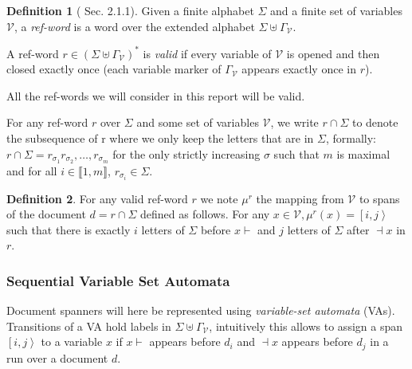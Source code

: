 \documentclass[12px]{article}
\theoremstyle{definition}
\newtheorem{definition}{Definition}
\newcommand{\Span}[1]{\left[ #1 \right\rangle}
\begin{document}
        \begin{definition}[\cite{peterfreund} Sec. 2.1.1]
          Given a finite alphabet $\Sigma$ and a finite set of variables
          $\mathcal{V}$, a \textit{ref-word} is a word over the extended
          alphabet $\Sigma \uplus \Gamma_\mathcal{V}$.

          A ref-word $r \in {(\Sigma \uplus \Gamma_\mathcal{V})}^*$ is
          \textit{valid} if every variable of $\mathcal{V}$ is opened and then
          closed exactly once (each variable marker of $\Gamma_\mathcal{V}$
          appears exactly once in $r$).
        \end{definition}

        All the ref-words we will consider in this report will be valid.

        For any ref-word $r$ over $\Sigma$ and some set of variables
        $\mathcal{V}$, we write $r \cap \Sigma$ to denote the subsequence of r
        where we only keep the letters that are in $\Sigma$, formally: $r \cap
        \Sigma = r_{\sigma_1} r_{\sigma_2}, \ldots, r_{\sigma_m}$ for the only
        strictly increasing $\sigma$ such that $m$ is maximal and for all $i
        \in \llbracket 1, m \rrbracket$, $r_{\sigma_i} \in \Sigma$.

        \begin{definition}
          For any valid ref-word $r$ we note $\mu^r$ the mapping from
          $\mathcal{V}$ to spans of the document $d = r \cap \Sigma$ defined as
          follows. For any $x \in \mathcal{V}, \mu^r (x) = \Span{i, j}$ such
          that there is exactly $i$ letters of $\Sigma$ before $x{\vdash}$ and
          $j$ letters of $\Sigma$ after ${\dashv}x$ in $r$.
        \end{definition}

      \subsubsection{Sequential Variable Set Automata}

        Document spanners will here be represented using \textit{variable-set
        automata} (VAs). Transitions of a VA hold labels in $\Sigma \uplus
        \Gamma_\mathcal{V}$, intuitively this allows to assign a span $\Span{i,
        j}$ to a variable $x$ if $x{\vdash}$ appears before $d_i$ and
        ${\dashv}x$ appears before $d_j$ in a run over a document $d$.
\end{document}
